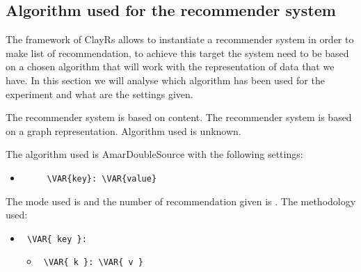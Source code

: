 \documentclass[11pt]{article}
\begin{document}
\subsection{Algorithm used for the recommender system}\label{subsec:algo}
The framework of ClayRs allows to instantiate a recommender system in order to make list of recommendation, to achieve
this target the system need to be based on a chosen algorithm that will work with the representation of data that
we have.
In this section we will analyse which algorithm has been used for the experiment and what are the settings
given.
\hfill\break
\hfill\break

The recommender system is based on content.
\hfill\break
\hfill\break
{}
The recommender system is based on a graph representation.
\hfill\break
\hfill\break
{}
Algorithm used is unknown.
\hfill\break
\hfill\break
{}

The algorithm used is AmarDoubleSource with the following settings:
\begin{itemize}
    \item \begin{verbatim}
     \VAR{key}: \VAR{value}
\end{verbatim}
\end{itemize}
\hfill\break
\hfill\break
The mode used is  and the number of recommendation given is
.
The methodology used:
\begin{itemize}
    \item
     \verb| \VAR{ key }:|
     \begin{itemize}
       \item
            \verb| \VAR{ k }: \VAR{ v } |
     \end{itemize}
\end{itemize}
\hfill\break
\hfill\break
\end{document}
